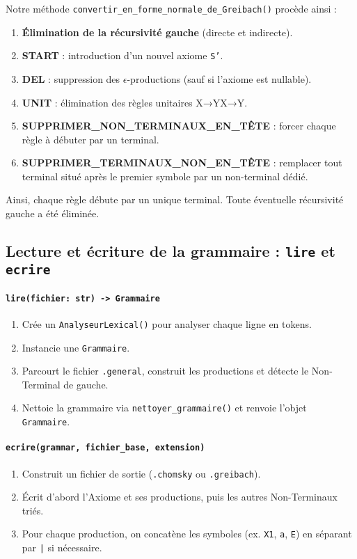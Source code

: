 \documentclass[a4paper,12pt]{article}
\begin{document}
Notre méthode \texttt{convertir\_en\_forme\_normale\_de\_Greibach()} procède ainsi :
\begin{enumerate}
    \item \textbf{Élimination de la récursivité gauche} (directe et indirecte).
    \item \textbf{START} : introduction d’un nouvel axiome \texttt{S'}.
    \item \textbf{DEL} : suppression des \(\epsilon\)-productions (sauf si l’axiome est nullable).
    \item \textbf{UNIT} : élimination des règles unitaires X→YX→Y.
    \item\textbf{SUPPRIMER\_NON\_TERMINAUX\_EN\_TÊTE} : forcer chaque règle à débuter par un terminal.
    \item \textbf{SUPPRIMER\_TERMINAUX\_NON\_EN\_TÊTE} : remplacer tout terminal situé après le premier symbole par un non-terminal dédié.
\end{enumerate}

Ainsi, chaque règle débute par un unique terminal. Toute éventuelle récursivité gauche a été éliminée.

\subsection{Lecture et écriture de la grammaire : \texttt{lire} et \texttt{ecrire}}
\label{subsec:lire-ecrire}

\paragraph{\texttt{lire(fichier: str) -> Grammaire}} 
\begin{enumerate}
    \item Crée un \texttt{AnalyseurLexical()} pour analyser chaque ligne en tokens.
    \item Instancie une \texttt{Grammaire}.
    \item Parcourt le fichier \texttt{.general}, construit les productions et détecte le Non-Terminal de gauche.
    \item Nettoie la grammaire via \texttt{nettoyer\_grammaire()} et renvoie l’objet \texttt{Grammaire}.
\end{enumerate}

\paragraph{\texttt{ecrire(grammar, fichier\_base, extension)}} 
\begin{enumerate}
    \item Construit un fichier de sortie (\texttt{.chomsky} ou \texttt{.greibach}).
    \item Écrit d’abord l’Axiome et ses productions, puis les autres Non-Terminaux triés.
    \item Pour chaque production, on concatène les symboles (ex. \texttt{X1}, \texttt{a}, \texttt{E}) en séparant par \texttt{|} si nécessaire.
\end{enumerate}
\end{document}
